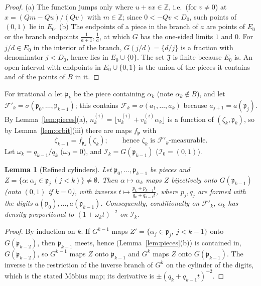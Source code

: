 \documentclass[11pt]{amsart}
\newtheorem{lemma}[theorem]{Lemma}
\theoremstyle{definition}
\numberwithin{equation}{section}
\newcommand{\Z}{\mathbb{Z}}
\newcommand{\cF}{\mathcal{F}}
\newcommand{\cI}{\mathcal{I}}
\newcommand{\fp}{\mathfrak{p}}
\newcommand{\fr}[1]{\{#1\}}
\begin{document}
\begin{proof}
(a) The function jumps only where $u+vx\in\Z$, i.e.\ (for $v\ne0$) at $x=(Qm-Qu)/(Qv)$ with $m\in\Z$; since $0<-Qv<D_0$, such points of $(0,1)$ lie in
$E_0$. (b) The endpoints of a piece in the branch of $a$ are points of $E_0$ or the branch endpoints $\frac1{a+1},\frac1a$, at which $G$ has the
one-sided limits $1$ and $0$. For $j/d\in E_0$ in the interior of the branch, $G(j/d)=\fr{d/j}$ is a fraction with denominator $j<D_0$, hence lies in
$E_0\cup\{0\}$. The set $\mathfrak J$ is finite because $E_0$ is. An open interval with endpoints in $E_0\cup\{0,1\}$ is the union of the pieces it
contains and of the points of $B$ in it.
\end{proof}

For irrational $\alpha$ let $\fp_k$ be the piece containing $\alpha_k$ (note $\alpha_k\notin B$), and let $\cF'_k=\sigma(\fp_0,\dots,\fp_{k-1})$; this
contains $\cF_k=\sigma(a_1,\dots,a_k)$ because $a_{j+1}=a(\fp_j)$. By Lemma~\ref{lem:pieces}(a), $n^{(i)}_k=\lfloor u^{(i)}_k+v^{(i)}_k\alpha_k\rfloor$ is a
function of $(\zeta_k,\fp_k)$, so by Lemma~\ref{lem:orbit}(iii) there are maps $f_\fp$ with
\begin{equation}\label{eq:zetarec}
\zeta_{k+1}=f_{\fp_k}(\zeta_k);\qquad\text{hence $\zeta_k$ is $\cF'_k$-measurable.}
\end{equation}
Let $\omega_k=q_{k-1}/q_k$ ($\omega_0=0$), and $\cI_k=G(\fp_{k-1})$ ($\cI_0=(0,1)$).

\begin{lemma}[Refined cylinders]\label{lem:refcyl}
Let $\fp_0,\dots,\fp_{k-1}$ be pieces and $Z=\{\alpha:\alpha_j\in\fp_j\ (j<k)\}\ne\emptyset$. Then $\alpha\mapsto\alpha_k$ maps $Z$ bijectively onto
$G(\fp_{k-1})$ (onto $(0,1)$ if $k=0$), with inverse $t\mapsto\frac{p_k+p_{k-1}t}{q_k+q_{k-1}t}$, where $p_j,q_j$ are formed with the digits
$a(\fp_0),\dots,a(\fp_{k-1})$. Consequently, conditionally on $\cF'_k$, $\alpha_k$ has density proportional to $(1+\omega_kt)^{-2}$ on $\cI_k$.
\end{lemma}

\begin{proof}
By induction on $k$. If $G^{k-1}$ maps $Z'=\{\alpha_j\in\fp_j,\ j<k-1\}$ onto $G(\fp_{k-2})$, then $\fp_{k-1}$ meets, hence (Lemma~\ref{lem:pieces}(b)) is contained in,
$G(\fp_{k-2})$, so $G^{k-1}$ maps $Z$ onto $\fp_{k-1}$ and $G^k$ maps $Z$ onto $G(\fp_{k-1})$. The inverse is the restriction of the inverse branch of
$G^k$ on the cylinder of the digits, which is the stated M\"obius map; its derivative is $\pm(q_k+q_{k-1}t)^{-2}$.
\end{proof}
\end{document}
